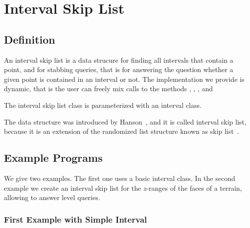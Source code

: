 
\ccParDims

\chapter{Interval Skip List}
\label{chapter_Interval_skip_list}




\section{Definition}
  
An interval skip list is a data strucure for finding all intervals 
that contain a point, and for stabbing queries, that is for answering 
the question whether a given point is contained in an interval or not. 
The implementation we provide is dynamic, that is the user can freely
mix calls  to the methods , , 
, and 

The interval skip list class is parameterized with an interval class.

The data structure was introduced by Hanson~\cite{h-islds-91}, and it is called
interval skip list, because it is an extension of the randomized list
structure known as skip list~\cite{p-slpab-90}.
 
\section{Example Programs}
\label{sectionIntervalskiplistExamples}

We give two examples. The first one uses a basic interval class.  In
the second example we create an interval skip list for the $z$-ranges
of the faces of a terrain, allowing to answer level queries.

\subsection{First Example with Simple Interval}

